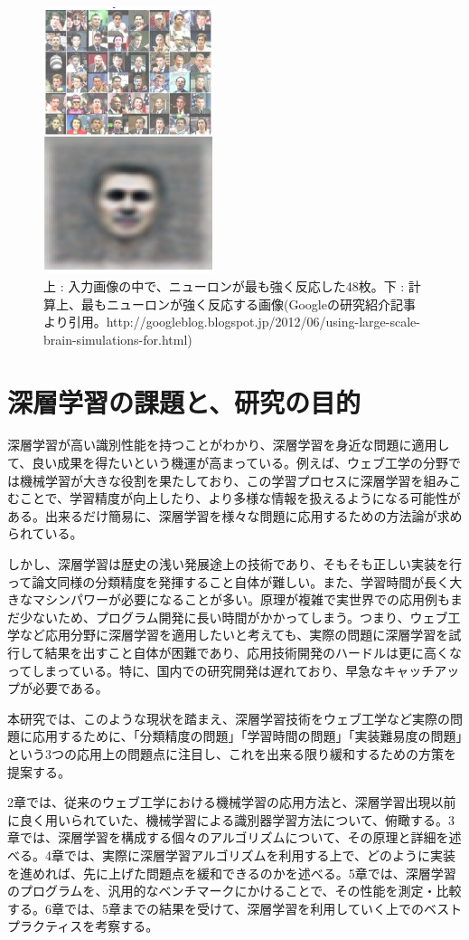 \begin{figure}[tbp]
 \begin{center}
  \includegraphics[width=50mm]{img/c1/google_face}
 \end{center}
 \caption{上 : 入力画像の中で、ニューロンが最も強く反応した48枚。下 : 計算上、最もニューロンが強く反応する画像\newline  (Googleの研究紹介記事より引用。http://googleblog.blogspot.jp/2012/06/using-large-scale-brain-simulations-for.html)}%
 
 \label{c1_facedetection}
\end{figure}


\section{深層学習の課題と、研究の目的}
深層学習が高い識別性能を持つことがわかり、深層学習を身近な問題に適用して、良い成果を得たいという機運が高まっている。例えば、ウェブ工学の分野では機械学習が大きな役割を果たしており、この学習プロセスに深層学習を組みこむことで、学習精度が向上したり、より多様な情報を扱えるようになる可能性がある。出来るだけ簡易に、深層学習を様々な問題に応用するための方法論が求められている。\par
しかし、深層学習は歴史の浅い発展途上の技術であり、そもそも正しい実装を行って論文同様の分類精度を発揮すること自体が難しい。また、学習時間が長く大きなマシンパワーが必要になることが多い。原理が複雑で実世界での応用例もまだ少ないため、プログラム開発に長い時間がかかってしまう。つまり、ウェブ工学など応用分野に深層学習を適用したいと考えても、実際の問題に深層学習を試行して結果を出すこと自体が困難であり、応用技術開発のハードルは更に高くなってしまっている。特に、国内での研究開発は遅れており、早急なキャッチアップが必要である。\par
本研究では、このような現状を踏まえ、深層学習技術をウェブ工学など実際の問題に応用するために、「分類精度の問題」「学習時間の問題」「実装難易度の問題」という3つの応用上の問題点に注目し、これを出来る限り緩和するための方策を提案する。\par
2章では、従来のウェブ工学における機械学習の応用方法と、深層学習出現以前に良く用いられていた、機械学習による識別器学習方法について、俯瞰する。3章では、深層学習を構成する個々のアルゴリズムについて、その原理と詳細を述べる。4章では、実際に深層学習アルゴリズムを利用する上で、どのように実装を進めれば、先に上げた問題点を緩和できるのかを述べる。5章では、深層学習のプログラムを、汎用的なベンチマークにかけることで、その性能を測定・比較する。6章では、5章までの結果を受けて、深層学習を利用していく上でのベストプラクティスを考察する。
